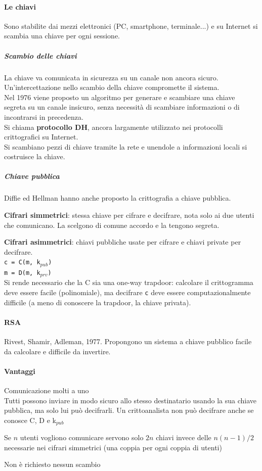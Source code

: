 \documentclass[10pt]{book}
\begin{document}
\paragraph{Le chiavi} Sono stabilite dai mezzi elettronici (PC, smartphone, terminale...) e su Internet si scambia una chiave per ogni sessione.
\subparagraph{Scambio delle chiavi} La chiave va comunicata in sicurezza su un canale non ancora sicuro. Un'intercettazione nello scambio della chiave compromette il sistema.\\
Nel 1976 viene proposto un algoritmo per generare e scambiare una chiave segreta su un canale insicuro, senza necessità di scambiare informazioni o di incontrarsi in precedenza.\\
Si chiama \textbf{protocollo DH}, ancora largamente utilizzato nei protocolli crittografici su Internet.\\
Si scambiano pezzi di chiave tramite la rete e unendole a informazioni locali si costruisce la chiave.
\subparagraph{Chiave pubblica} Diffie ed Hellman hanno anche proposto la crittografia a chiave pubblica.
\begin{list}{}{}
	\item \textbf{Cifrari simmetrici}: stessa chiave per cifrare e decifrare, nota solo ai due utenti che comunicano. La scelgono di comune accordo e la tengono segreta.
	\item \textbf{Cifrari asimmetrici}: chiavi pubbliche usate per cifrare e chiavi private per decifrare.\\
	\texttt{c = C(m, k$_{pub}$)}\\
	\texttt{m = D(m, k$_{prv}$)}\\
	Si rende necessario che la C sia una one-way trapdoor: calcolare il crittogramma deve essere facile (polinomiale), ma decifrare \texttt{c} deve essere computazionalmente difficile (a meno di conoscere la trapdoor, la chiave privata).
\end{list}
\paragraph{RSA} Rivest, Shamir, Adleman, 1977. Propongono un sistema a chiave pubblico facile da calcolare e difficile da invertire.
\paragraph{Vantaggi}
\begin{list}{}{}
	\item Comunicazione molti a uno\\
	Tutti possono inviare in modo sicuro allo stesso destinatario usando la sua chiave pubblica, ma solo lui può decifrarli. Un crittoanalista non può decifrare anche se conosce C, D e k$_{pub}$
	\item Se $n$ utenti vogliono comunicare servono solo $2n$ chiavi invece delle $n(n-1)/2$ necessarie nei cifrari simmetrici (una coppia per ogni coppia di utenti)
	\item Non è richiesto nessun scambio
\end{list}
\end{document}
